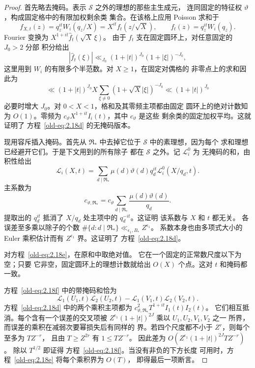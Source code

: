 \documentclass[11pt,a4paper]{article}
\numberwithin{equation}{section}
\numberwithin{figure}{section}
\theoremstyle{definition}
\theoremstyle{remark}
\begin{document}
\begin{proof}
首先略去掩码。表示 \(\mathcal S\) 之外的理想的那些主生成元，
连同固定的特征权
\(\vartheta\)，构成固定格中的有限加权剩余类
集合。在该格上应用 Poisson 求和于
\[
 f_{X,t}(z)=q_z^{it}W_i(q_z/X)
           =X^{it}f_t(z/\sqrt X),\qquad
 f_t(z)=q_z^{it}W_i(q_z).
\]
Fourier 变换为
\(X^{1+it}\widehat f_t(\sqrt X\,\xi)\)。
由于 \(f_t\) 支在固定圆环上，对任意固定的 \(J_0>2\) 分部
积分给出
\[
 |\widehat f_t(\xi)|
 \ll_{J_0} (1+|t|)^{J_0}(1+|\xi|)^{-J_0},
\]
这里用到 \(W_i\) 的有限多个半范数。对 \(X\ge1\)，在固定对偶格的
非零点上的求和因此为
\[
 \ll (1+|t|)^{J_0} X
       \sum_{\xi\ne0}(1+\sqrt X|\xi|)^{-J_0}
 \ll (1+|t|)^{J_0}
\]
必要时增大 \(J_0\)。对 \(0<X<1\)，格和及其零频主项都由固定
圆环上的绝对计数知为 \(O(1)\)。零频为
\(c_\vartheta X^{1+it}I_i(t)\)，其中 \(c_\vartheta\) 是这些
剩余类的固定加权平均。这就证明了
方程~\eqref{old-eq:2.18d} 的无掩码版本。

现用容斥插入掩码。首先从
\(\mathfrak R_*\) 中去掉它位于 \(\mathcal S\) 中的素理想，因为每个
求和理想已经避开它们。于是下文用到的所有除子
都在 \(\mathcal S\) 之外。记 \(\mathcal L_i^0\) 为
无掩码的和，由积性给出
\[
 \mathcal L_i(X,t)
 =\sum_{d\mid\mathfrak R_*}
       \mu(d)\vartheta(d)q_d^{it}\mathcal L_i^0(X/q_d,t).
\]
主系数为
\[
 c_{\vartheta,\mathfrak R_*}
 =c_\vartheta\sum_{d\mid\mathfrak R_*}
             \frac{\mu(d)\vartheta(d)}{q_d}.
\]
提取出的 \(q_d^{it}\) 抵消了
\(X/q_d\) 处主项中的 \(q_d^{-it}\)。这证明
该系数与 \(X\) 和 \(t\) 都无关。
各误差至多乘以除子的个数
\(\#\{d:d\mid\mathfrak R_*\}\ll_{\epsilon_1,B_*}Z^{\epsilon_1}\)。
系数本身也由多项式大小的 Euler 乘积估计而有
\(Z^{\epsilon_1}\) 界。这证明了
方程~\eqref{old-eq:2.18d}。

对方程~\eqref{old-eq:2.18e}，在原和中取绝对值。
它在一个固定的正常数尺度以下为空；只要
它非空，固定圆环上的理想计数就给出 \(O(X)\)
个点。这对 \(t\) 和掩码都一致。

方程~\eqref{old-eq:2.18f} 中的带掩码和恰为
\[
 \mathcal L_1(U_1,t)\mathcal L_2(U_2,t)
 -\mathcal L_1(V_1,t)\mathcal L_2(V_2,t).
\]
方程~\eqref{old-eq:2.18d} 中的两个乘积主项都为
\(c_{\vartheta,\mathfrak R_*}^2T^{1+it}I_1(t)I_2(t)\)。
它们相互抵消。每个含有一个误差的交叉项被
\(Z^{\epsilon_1}(1+|t|)^{2J}\) 乘以 \(U_1,U_2,V_1,V_2\) 之一
所界，而误差的乘积在减弱次要幂损失后有同样的
界。若四个尺度都不小于 \(Z^r\)，则每个至多为 \(TZ^{-r}\)，
且由 \(T\ge Z^{2r}\) 有 \(1\le TZ^{-r}\)。
因此差为
\(O(Z^{\epsilon_1}(1+|t|)^{2J}TZ^{-r})\)。
除以 \(T^{1/2}\) 即证得
方程~\eqref{old-eq:2.18f}。当没有非负的下方长度
可用时，方程~\eqref{old-eq:2.18e} 将每个乘积界为 \(O(T)\)，
即得最后一项断言。
\end{proof}
\end{document}
